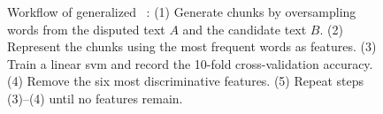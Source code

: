         

\begin{figure}[htbp]
    \centering
    
    \caption{Workflow of generalized \unmasking{}~\citep{bevendorff_generalizing_2019}: 
    (1) Generate chunks by oversampling words from the disputed text $A$ and the candidate text $B$. 
    (2) Represent the chunks using the most frequent words as features. 
    (3) Train a linear \ac{svm} and record the 10-fold cross-validation accuracy. 
    (4) Remove the six most discriminative features. 
    (5) Repeat steps (3)–(4) until no features remain.}
    \label{fig:generalized_unmasking}
\end{figure}

